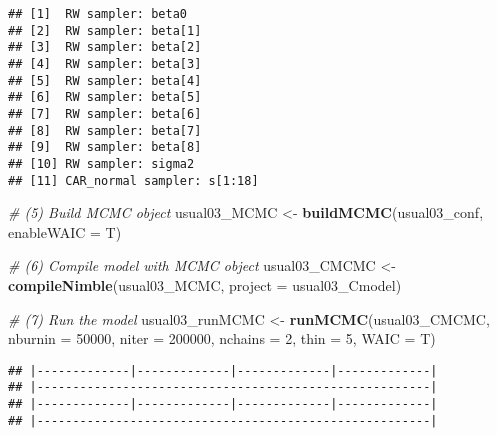 \documentclass[]{article}
\newenvironment{Shaded}{\begin{snugshade}}{\end{snugshade}}
\newcommand{\CommentTok}[1]{\textcolor[rgb]{0.56,0.35,0.01}{\textit{#1}}}
\newcommand{\DataTypeTok}[1]{\textcolor[rgb]{0.13,0.29,0.53}{#1}}
\newcommand{\DecValTok}[1]{\textcolor[rgb]{0.00,0.00,0.81}{#1}}
\newcommand{\KeywordTok}[1]{\textcolor[rgb]{0.13,0.29,0.53}{\textbf{#1}}}
\newcommand{\NormalTok}[1]{#1}
\newcommand{\OperatorTok}[1]{\textcolor[rgb]{0.81,0.36,0.00}{\textbf{#1}}}
\newcommand{\StringTok}[1]{\textcolor[rgb]{0.31,0.60,0.02}{#1}}
\begin{document}
\begin{Shaded}
\end{Shaded}

\begin{verbatim}
## [1]  RW sampler: beta0
## [2]  RW sampler: beta[1]
## [3]  RW sampler: beta[2]
## [4]  RW sampler: beta[3]
## [5]  RW sampler: beta[4]
## [6]  RW sampler: beta[5]
## [7]  RW sampler: beta[6]
## [8]  RW sampler: beta[7]
## [9]  RW sampler: beta[8]
## [10] RW sampler: sigma2
## [11] CAR_normal sampler: s[1:18]
\end{verbatim}

\begin{Shaded}
\begin{Highlighting}[]
\CommentTok{# (5) Build MCMC object}
\NormalTok{usual03_MCMC <-}\StringTok{ }\KeywordTok{buildMCMC}\NormalTok{(usual03_conf, }\DataTypeTok{enableWAIC =}\NormalTok{ T) }

\CommentTok{# (6) Compile model with MCMC object}
\NormalTok{usual03_CMCMC <-}\StringTok{ }\KeywordTok{compileNimble}\NormalTok{(usual03_MCMC, }\DataTypeTok{project =}\NormalTok{ usual03_Cmodel)  }

\CommentTok{# (7) Run the model}
\NormalTok{usual03_runMCMC <-}\StringTok{ }\KeywordTok{runMCMC}\NormalTok{(usual03_CMCMC, }\DataTypeTok{nburnin =} \DecValTok{50000}\NormalTok{, }\DataTypeTok{niter =} \DecValTok{200000}\NormalTok{, }\DataTypeTok{nchains =} \DecValTok{2}\NormalTok{, }\DataTypeTok{thin =} \DecValTok{5}\NormalTok{, }\DataTypeTok{WAIC =}\NormalTok{ T)}
\end{Highlighting}
\end{Shaded}

\begin{verbatim}
## |-------------|-------------|-------------|-------------|
## |-------------------------------------------------------|
## |-------------|-------------|-------------|-------------|
## |-------------------------------------------------------|
\end{verbatim}
\end{document}

